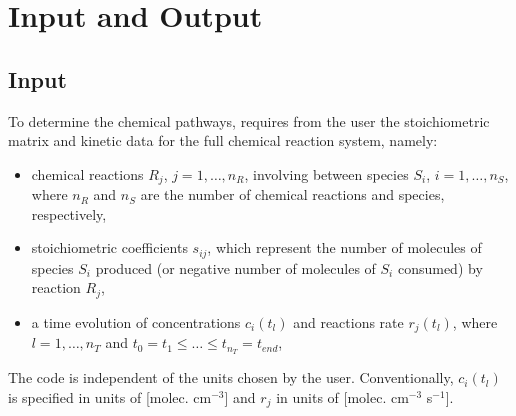 
\chapter{Input and Output}
\label{chap_3}


\section{Input}
\label{sec_3_1}


To determine the chemical pathways, \pump{} requires from the user the stoichiometric 
matrix and kinetic data for the full chemical reaction system, namely:
\begin{itemize}
\item {chemical reactions $R_j$, $j = 1, \ldots, n_R$, involving between 
species $S_i$, $i = 1,\ldots, n_S$,
where $n_R$ and $n_S$ are the number of chemical reactions and species, respectively,
}
\item {stoichiometric coefficients $s_{ij}$, which represent the number of 
molecules of species $S_i$ produced (or negative number of molecules of 
$S_i$ consumed) by reaction $R_j$,}
\item{a time evolution of concentrations $c_i(t_l)$ and reactions rate $r_j(t_l)$, 
where $l = 1, \ldots, n_T$ and $t_0 = t_1\leq\ldots \leq t_{n_T}=t_{end}$,}
\end{itemize}
The code is independent of the units chosen by the user.  Conventionally, $c_i(t_l)$ is specified in units of [molec. cm$^{-3}$] and $r_j$ in units of [molec. cm$^{-3}$ s$^{-1}$]. 

